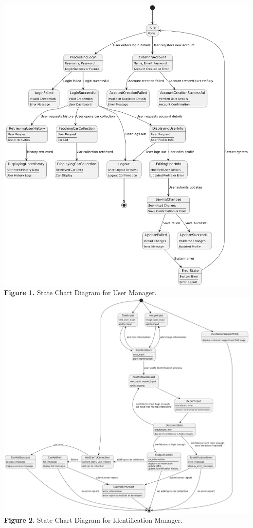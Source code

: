 \documentclass[]{article}
\begin{document}
\begin{center}
	\includegraphics[scale=0.5]{State Diagrams/omar_diagram.png}\\
	\textbf{Figure 1.} State Chart Diagram for User Manager.\\

	\includegraphics[scale=0.38]{State Diagrams/IdentStateDiagramUML.png}\\
	\textbf{Figure 2.} State Chart Diagram for Identification Manager.\\
\end{center}
\end{document}
